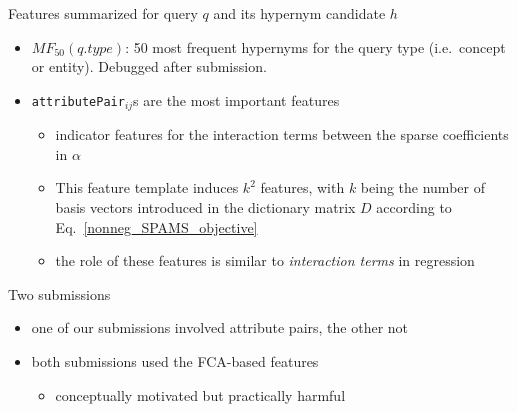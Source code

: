 \documentclass{beamer}
\newlength{\onecolwid}
\newcommand{\bull}[1]{
  \begin{itemize}
    \item #1
  \end{itemize}
}
\begin{document}
\begin{frame}[t]
\begin{columns}[t]
\begin{column}{\onecolwid}
\begin{block}{Features summarized}{ for query $q$ and its hypernym candidate $h$ }

\begin{itemize}
  \item $MF_{50}(q.type)$: 50 most frequent hypernyms for the query type
    (i.e.~concept or entity). Debugged after submission.


  \item \texttt{attributePair}$_{ij}$s are the most important features
    \begin{itemize}
      \item indicator features for the interaction terms between the sparse
        coefficients in $\alpha$
      \item This feature template induces $k^2$ features, with $k$ being the
        number of basis vectors introduced in the dictionary matrix $D$
        according to Eq.~\ref{nonneg_SPAMS_objective}
      \item the role of these features is similar to \emph{interaction terms}
        in regression
    \end{itemize}
\end{itemize}
\end{block}

  \bigskip
  \begin{block}{Two submissions}
    \begin{itemize}
      \item one of our submissions involved attribute pairs, the other not
      \item both submissions used the FCA-based features
        \bull{conceptually motivated but practically harmful}
    \end{itemize}


\end{block}
\end{column}
\end{columns}
\end{frame}
\end{document}
